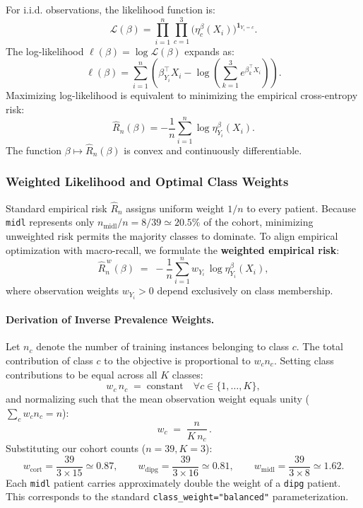 \documentclass[a4paper,11pt]{paper}
\theoremstyle{plain}
\theoremstyle{definition}
\theoremstyle{remark}
\begin{document}
For i.i.d. observations, the likelihood function is:
$$\mathcal{L}(\beta) = \prod_{i=1}^n \prod_{c=1}^3 \big(\eta_c^\beta(X_i)\big)^{\mathbf{1}_{Y_i=c}}.$$
The log-likelihood $\ell(\beta) = \log \mathcal{L}(\beta)$ expands as:
$$\ell(\beta) = \sum_{i=1}^n \left( \beta_{Y_i}^\top X_i - \log\left(\sum_{k=1}^3 e^{\beta_k^\top X_i}\right) \right).$$
Maximizing log-likelihood is equivalent to minimizing the empirical cross-entropy risk:
$$\hat{R}_n(\beta) = -\frac{1}{n} \sum_{i=1}^n \log \eta_{Y_i}^\beta(X_i).$$
The function $\beta \mapsto \hat{R}_n(\beta)$ is convex and continuously differentiable.

\subsubsection{Weighted Likelihood and Optimal Class Weights}
\label{sec:weights}

Standard empirical risk $\hat R_n$ assigns uniform weight $1/n$ to every patient. Because \texttt{midl} represents only $n_{\text{midl}}/n = 8/39 \simeq 20.5\%$ of the cohort, minimizing unweighted risk permits the majority classes to dominate. To align empirical optimization with macro-recall, we formulate the \textbf{weighted empirical risk}:
$$
    \hat{R}_n^{\,w}(\beta) \;=\; -\frac{1}{n} \sum_{i=1}^n w_{Y_i}\,\log \eta_{Y_i}^\beta(X_i),
$$
where observation weights $w_{Y_i} > 0$ depend exclusively on class membership.

\paragraph{Derivation of Inverse Prevalence Weights.}
Let $n_c$ denote the number of training instances belonging to class $c$. The total contribution of class $c$ to the objective is proportional to $w_c n_c$. Setting class contributions to be equal across all $K$ classes:
$$
    w_c\, n_c \;=\; \text{constant} \quad \forall c \in \{1,\dots,K\},
$$
and normalizing such that the mean observation weight equals unity ($\sum_c w_c n_c = n$):
$$
    \boxed{\,w_c \;=\; \frac{n}{K\, n_c}\,}.
$$
Substituting our cohort counts ($n = 39, K = 3$):
$$
    w_{\text{cort}} = \frac{39}{3 \times 15} \simeq 0.87,\qquad
    w_{\text{dipg}} = \frac{39}{3 \times 16} \simeq 0.81,\qquad
    w_{\text{midl}} = \frac{39}{3 \times 8} \simeq 1.62.
$$
Each \texttt{midl} patient carries approximately double the weight of a \texttt{dipg} patient. This corresponds to the standard \texttt{class\_weight="balanced"} parameterization.
\end{document}
